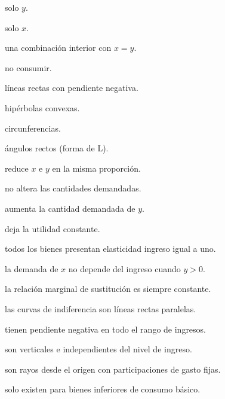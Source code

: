 \begin{opts}
    \item solo $y$.
    \item solo $x$.
    \item una combinación interior con $x=y$.
    \item no consumir.
\end{opts}

\begin{opts}
    \item líneas rectas con pendiente negativa.
    \item hipérbolas convexas.
    \item circunferencias.
    \item ángulos rectos (forma de L).
\end{opts}

\begin{opts}
    \item reduce $x$ e $y$ en la misma proporción.
    \item no altera las cantidades demandadas.
    \item aumenta la cantidad demandada de $y$.
    \item deja la utilidad constante.
\end{opts}

\begin{opts}
    \item todos los bienes presentan elasticidad ingreso igual a uno.
    \item la demanda de $x$ no depende del ingreso cuando $y>0$.
    \item la relación marginal de sustitución es siempre constante.
    \item las curvas de indiferencia son líneas rectas paralelas.
\end{opts}

\begin{opts}
    \item tienen pendiente negativa en todo el rango de ingresos.
    \item son verticales e independientes del nivel de ingreso.
    \item son rayos desde el origen con participaciones de gasto fijas.
    \item solo existen para bienes inferiores de consumo básico.
\end{opts}

